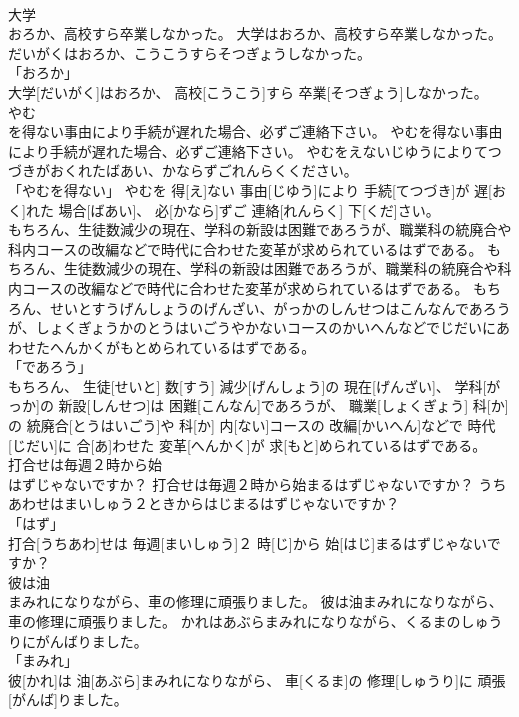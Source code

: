 \documentclass[8pt]{extreport}
\begin{document}
\begin{CJK}{UTF8}{min}
\\	大学
\\	おろか、高校すら卒業しなかった。	大学はおろか、高校すら卒業しなかった。	だいがくはおろか、こうこうすらそつぎょうしなかった。	
\\	「おろか」 
\\	大学[だいがく]はおろか、 高校[こうこう]すら 卒業[そつぎょう]しなかった。		
\\	やむ
\\	を得ない事由により手続が遅れた場合、必ずご連絡下さい。	やむを得ない事由により手続が遅れた場合、必ずご連絡下さい。	やむをえないじゆうによりてつづきがおくれたばあい、かならずごれんらくください。	
\\	「やむを得ない」	やむを 得[え]ない 事由[じゆう]により 手続[てつづき]が 遅[おく]れた 場合[ばあい]、 必[かなら]ずご 連絡[れんらく] 下[くだ]さい。		
\\	もちろん、生徒数減少の現在、学科の新設は困難であろうが、職業科の統廃合や科内コースの改編などで時代に合わせた変革が求められているはずである。	もちろん、生徒数減少の現在、学科の新設は困難であろうが、職業科の統廃合や科内コースの改編などで時代に合わせた変革が求められているはずである。	もちろん、せいとすうげんしょうのげんざい、がっかのしんせつはこんなんであろうが、しょくぎょうかのとうはいごうやかないコースのかいへんなどでじだいにあわせたへんかくがもとめられているはずである。	
\\	「であろう」 
\\	もちろん、 生徒[せいと] 数[すう] 減少[げんしょう]の 現在[げんざい]、 学科[がっか]の 新設[しんせつ]は 困難[こんなん]であろうが、 職業[しょくぎょう] 科[か]の 統廃合[とうはいごう]や 科[か] 内[ない]コースの 改編[かいへん]などで 時代[じだい]に 合[あ]わせた 変革[へんかく]が 求[もと]められているはずである。		
\\	打合せは毎週２時から始
\\	はずじゃないですか？	打合せは毎週２時から始まるはずじゃないですか？	うちあわせはまいしゅう２ときからはじまるはずじゃないですか？	
\\	「はず」 
\\	打合[うちあわ]せは 毎週[まいしゅう]２ 時[じ]から 始[はじ]まるはずじゃないですか？		
\\	彼は油
\\	まみれになりながら、車の修理に頑張りました。	彼は油まみれになりながら、車の修理に頑張りました。	かれはあぶらまみれになりながら、くるまのしゅうりにがんばりました。	
\\	「まみれ」 
\\	彼[かれ]は 油[あぶら]まみれになりながら、 車[くるま]の 修理[しゅうり]に 頑張[がんば]りました。		

\end{CJK}
\end{document}
